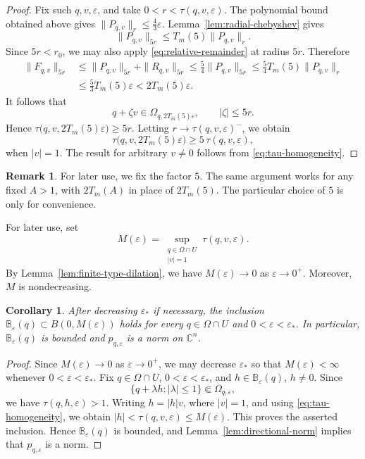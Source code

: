 \documentclass[11pt]{article}
\newtheorem{corollary}[theorem]{Corollary}
\theoremstyle{definition}
\newtheorem{remark}[theorem]{Remark}
\newcommand{\C}{\mathbb{C}}
\newcommand{\eps}{\varepsilon}
\begin{document}
\begin{proof}
	Fix such \(q,v,\eps\), and take
\(
	0<r<\tau(q,v,\eps).
\)
	The polynomial bound obtained above gives
	\(\|P_{q,v}\|_r\le\frac43\eps\).
	Lemma~\ref{lem:radial-chebyshev} gives
	\[
	\|P_{q,v}\|_{5r}
	\le
	T_m(5)\|P_{q,v}\|_r.
	\]
	Since \(5r<r_0\), we may also apply
	\eqref{eq:relative-remainder} at radius \(5r\).  Therefore
	\[
	\begin{aligned}
		\|F_{q,v}\|_{5r}
		&\le
		\|P_{q,v}\|_{5r}+\|R_{q,v}\|_{5r}
		\le
		\frac54\|P_{q,v}\|_{5r}
		\le
		\frac54 T_m(5)\|P_{q,v}\|_r\\
		&\le
		\frac53 T_m(5)\eps
		<
		2T_m(5)\eps.
	\end{aligned}
	\]
	It follows that
	\[
	q+\zeta v\in\Omega_{q,2T_m(5)\eps},
	\qquad |\zeta|\le5r.
	\]
	Hence
	\(
	\tau\bigl(q,v,2T_m(5)\eps\bigr)\ge5r.
\)
	Letting \(r\to\tau(q,v,\eps)^-\), we obtain
	\[
	\tau\bigl(q,v,2T_m(5)\eps\bigr)
	\ge
	5\,\tau(q,v,\eps),
	\]
	when \(|v|=1\).  The result for arbitrary \(v\ne0\) follows from
	\eqref{eq:tau-homogeneity}.
\end{proof}
\begin{remark}
For later use, we fix the factor \(5\).  The same argument works for
any fixed \(A>1\), with \(2T_m(A)\) in place of \(2T_m(5)\).  The particular
choice of \(5\) is only for convenience.
\end{remark}
For later use, set
\begin{equation*}
	M(\eps)
	=
	\sup_{\substack{q\in\Omega\cap U\\ |v|=1}}
	\tau(q,v,\eps).
\end{equation*}
By Lemma~\ref{lem:finite-type-dilation}, we have \(M(\eps)\to0\)
as \(\eps\to0^+\). Moreover, \(M\) is nondecreasing.
\begin{corollary}\label{cor:local-directional-norm}
	After decreasing \(\eps_*\) if necessary, the inclusion
	\(\mathbb B_\eps(q)\subset B(0,M(\eps))\) holds for every
	\(q\in\Omega\cap U\) and \(0<\eps<\eps_*\).
	In particular, \(\mathbb B_\eps(q)\) is bounded and
	\(p_{q,\eps}\) is a norm on \(\C^n\).
\end{corollary}

\begin{proof}
	Since \(M(\eps)\to0\) as \(\eps\to0^+\), we may decrease \(\eps_*\) so that
	\(M(\eps)<\infty\) whenever \(0<\eps<\eps_*\).
	Fix \(q\in\Omega\cap U\), \(0<\eps<\eps_*\), and
	\(h\in\mathbb B_\eps(q)\), \(h\ne0\).  Since
	\[
	\{q+\lambda h:|\lambda|\le1\}
	\Subset
	\Omega_{q,\eps},
	\]
	we have \(\tau(q,h,\eps)>1\).
	Writing \(h=|h|v\), where \(|v|=1\), and using
	\eqref{eq:tau-homogeneity}, we obtain
	\(|h| < \tau(q,v,\eps) \le M(\eps)\).
	This proves the asserted inclusion.  Hence
	\(\mathbb B_\eps(q)\) is bounded, and
	Lemma~\ref{lem:directional-norm} implies that \(p_{q,\eps}\) is a norm.
\end{proof}
\end{document}
